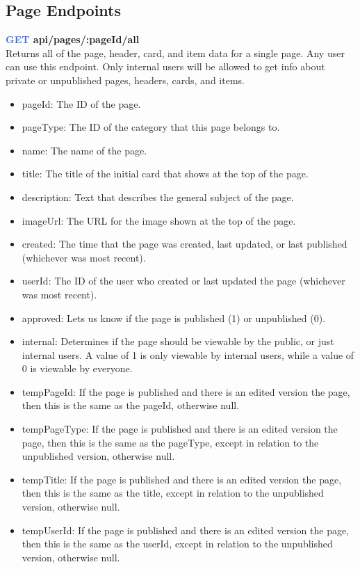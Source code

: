 \documentclass[onecolumn, draftclsnofoot,10pt, compsoc, usenames, dvipsnames]{IEEEtran}
\begin{document}
\subsection{Page Endpoints}


\noindent
\textbf{\textcolor{RoyalBlue}{GET} api/pages/:pageId/all} \\
Returns all of the page, header, card, and item data for a single page. Any user can use this endpoint. Only internal users will be allowed to get info about private or unpublished pages, headers, cards, and items.
\begin{itemize}
    \item pageId: The ID of the page.
    \item pageType: The ID of the category that this page belongs to.
    \item name: The name of the page.
    \item title: The title of the initial card that shows at the top of the page.
    \item description: Text that describes the general subject of the page.
    \item imageUrl: The URL for the image shown at the top of the page.
    \item created: The time that the page was created, last updated, or last published (whichever was most recent).
    \item userId: The ID of the user who created or last updated the page (whichever was most recent).
    \item approved: Lets us know if the page is published (1) or unpublished (0).
    \item internal: Determines if the page should be viewable by the public, or just internal users. A value of 1 is only viewable by internal users, while a value of 0 is viewable by everyone.
    \item tempPageId: If the page is published and there is an edited version the page, then this is the same as the pageId, otherwise null.
    \item tempPageType: If the page is published and there is an edited version the page, then this is the same as the pageType, except in relation to the unpublished version, otherwise null.
    \item tempTitle: If the page is published and there is an edited version the page, then this is the same as the title, except in relation to the unpublished version, otherwise null.
    \item tempUserId: If the page is published and there is an edited version the page, then this is the same as the userId, except in relation to the unpublished version, otherwise null.

\end{itemize}
\end{document}
